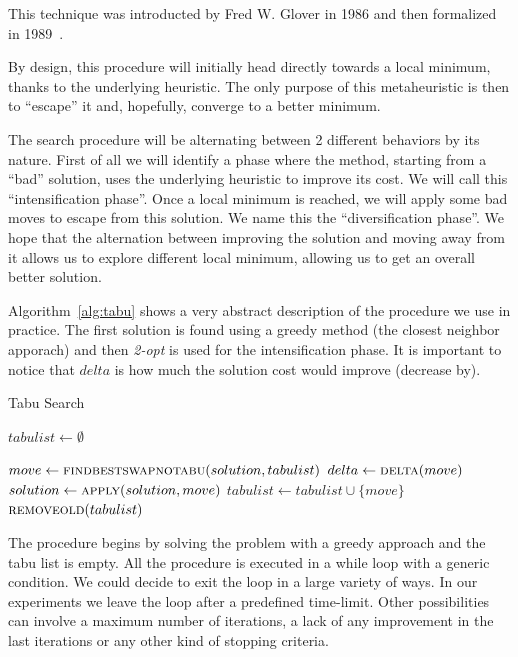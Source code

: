 \documentclass{article}
\begin{document}
This technique was introducted by Fred W. Glover in 1986 and then formalized
in 1989~\cite{Glover:TabuSearch}.

By design, this procedure will initially head directly towards a local minimum, thanks to the underlying heuristic. The only purpose of this metaheuristic is then to ``escape'' it and, hopefully, converge to a better minimum.

The search procedure will be alternating between 2 different behaviors by its nature. First of all
we will identify a phase where the method, starting from a ``bad'' solution, uses the underlying
heuristic to improve its cost. We will call this ``intensification phase''. Once a local minimum is reached, we will apply some bad moves to escape from this solution. We name this the ``diversification phase''. We hope that the alternation between improving the solution and moving
away from it allows us to explore different local minimum, allowing us to get an overall better
solution.

Algorithm~\ref{alg:tabu} shows a very abstract description of the procedure we use in practice. The first solution is found using a greedy method (the closest neighbor apporach) and then \textit{2-opt} is used for the intensification phase. It is important to notice that $delta$ is
how much the solution cost would improve (decrease by).

\begin{algorithm}[ht]
\caption{Tabu Search}
\label{alg:tabu}
\begin{algorithmic}
    \State{}
    \State $tabulist \gets \emptyset$

        \State $move \gets \Call{findbestswapnotabu}{solution, tabulist}$
        \State $delta \gets \Call{delta}{move}$
        \State $solution \gets \Call{apply}{solution, move}$
          \State $tabulist \gets tabulist \cup \{move\}$
        \EndIf
        \State $\Call{removeold}{tabulist}$
    \EndWhile

  \EndProcedure

\end{algorithmic}
\end{algorithm}

The procedure begins by solving the problem with a greedy approach and the tabu list
is empty. All the procedure is executed in a while loop with a generic condition. We could
decide to exit the loop in a large variety of ways. In our experiments we leave the loop
after a predefined time-limit. Other possibilities can involve a maximum number of iterations, a lack of any improvement in the last iterations or any other kind of stopping criteria.
\end{document}
